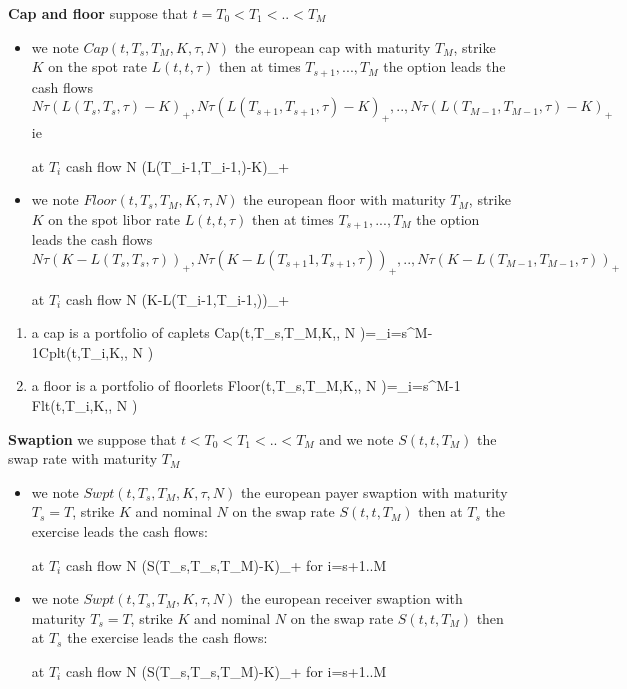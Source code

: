 {\bf Cap and floor} 
suppose that  $t=T_0<T_1<..<T_M$
\begin{itemize}
\item we note $Cap(t,T_s,T_M,K,\tau , N )$ the european  cap with maturity  $T_M$, strike $K$  on the spot rate $L(t,t,\tau)$ then at times $T_{s+1},...,T_M$ the option leads the cash flows  $N \tau (L(T_{s},T_{s},\tau)-K)_+, N \tau (L(T_{s+1},T_{s+1},\tau)-K)_+,.., N\tau (L(T_{M-1},T_{M-1},\tau)-K)_+$ ie 

\ban
\textrm{at $T_i$  cash flow } N \tau (L(T_{i-1},T_{i-1},\tau)-K)_+
\ean

\item we  note $Floor(t,T_s,T_M,K,\tau , N)$ the european floor with maturity $T_M$, strike $K$  on the spot libor rate $L(t,t,\tau)$ then at times $T_{s+1},...,T_M$ the option leads the cash flows  $N \tau (K-L(T_s,T_s,\tau))_+,N \tau (K-L(T_{s+1}1,T_{s+1},\tau))_+,..,N \tau (K-L(T_{M-1},T_{M-1},\tau))_+$ 

\ban
\textrm{at  $T_i$  cash flow } N \tau (K-L(T_{i-1},T_{i-1},\tau))_+
\ean

\end{itemize}

\begin{enumerate}
\item a cap is a portfolio of  caplets 
\ban
Cap(t,T_s,T_M,K,\tau, N )=\sum_{i=s}^{M-1}Cplt(t,T_i,K,\tau , N )
\ean
\item a floor is a portfolio of floorlets
\ban
Floor(t,T_s,T_M,K,\tau , N )=\sum_{i=s}^{M-1} Flt(t,T_i,K,\tau , N )
\ean
\end{enumerate}

{\bf Swaption} 
we suppose that  $t<T_0<T_1<..<T_M$ and we note $S(t,t,T_M)$ the swap rate with maturity $T_M$
\begin{itemize}
\item we note $Swpt(t,T_s,T_M,K,\tau,N)$ the european payer swaption with maturity $T_s=T$,  strike $K$ and nominal $N$  on the swap rate  $S(t,t,T_M)$   then at $T_s$ the exercise leads the cash flows:


\ban
\textrm{at $T_i$  cash flow } N \tau (S(T_s,T_s,T_M)-K)_+ \quad \textrm{for }i=s+1..M
\ean

\item we note $Swpt(t,T_s,T_M,K,\tau,N)$ the european receiver swaption with maturity $T_s=T$,  strike $K$ and nominal $N$  on the swap rate  $S(t,t,T_M)$   then at $T_s$ the exercise leads the cash flows:


\ban
\textrm{at $T_i$  cash flow } N \tau (S(T_s,T_s,T_M)-K)_+ \quad \textrm{for }i=s+1..M
\ean

\end{itemize}





